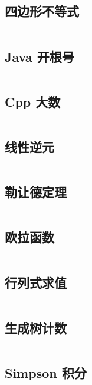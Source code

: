 \documentclass[titlepage,landscape,a4paper,10pt]{article}
\begin{document}
\begin{multicols}{2}
\begin{spacing}{0.8}
\subsection{四边形不等式}
\inputminted{cpp}{Math/四边形不等式.cpp}

\subsection{Java 开根号}
\inputminted{java}{Math/Java开根号.java}

\subsection{Cpp 大数}
\inputminted{cpp}{Math/C++大数.cpp}

\subsection{线性逆元}
\inputminted{cpp}{Math/linear-inversion.cc}

\subsection{勒让德定理}
\inputminted{cpp}{Math/Legendre.cpp}

\subsection{欧拉函数}
\inputminted{cpp}{Math/欧拉函数.cpp}

\subsection{行列式求值}
\inputminted{cpp}{Math/Det.cpp}

\subsection{生成树计数}
\inputminted{cpp}{Math/生成树计数.cpp}

\subsection{Simpson 积分}
\inputminted{cpp}{Math/Simpson.cpp}



\end{spacing}
\end{multicols}
\end{document}
